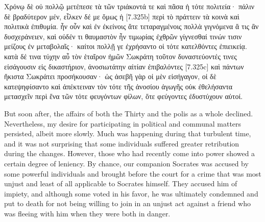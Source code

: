 \documentclass[12pt]{book}
\begin{document}
\begin{pairs}
\begin{Rightside}
\begin{Ancient Greek}
\beginnumbering
\pstart
Χρόνῳ δὲ οὐ πολλῷ μετέπεσε τὰ τῶν τριάκοντά τε καὶ πᾶσα ἡ τότε πολιτεία· πάλιν δὲ βραδύτερον μέν, εἷλκεν δέ με ὅμως ἡ [7.325b] περὶ τὸ πράττειν τὰ κοινὰ καὶ πολιτικὰ ἐπιθυμία. ἦν οὖν καὶ ἐν ἐκείνοις ἅτε τεταραγμένοις πολλὰ γιγνόμενα ἅ τις ἂν δυσχεράνειεν, καὶ οὐδέν τι θαυμαστὸν ἦν τιμωρίας ἐχθρῶν γίγνεσθαί τινών τισιν μείζους ἐν μεταβολαῖς· καίτοι πολλῇ γε ἐχρήσαντο οἱ τότε κατελθόντες ἐπιεικείᾳ. κατὰ δέ τινα τύχην αὖ τὸν ἑταῖρον ἡμῶν Σωκράτη τοῦτον δυναστεύοντές τινες εἰσάγουσιν εἰς δικαστήριον, ἀνοσιωτάτην αἰτίαν ἐπιβαλόντες [7.325c] καὶ πάντων ἥκιστα Σωκράτει προσήκουσαν· ὡς ἀσεβῆ γὰρ οἱ μὲν εἰσήγαγον, οἱ δὲ κατεψηφίσαντο καὶ ἀπέκτειναν τὸν τότε τῆς ἀνοσίου ἀγωγῆς οὐκ ἐθελήσαντα μετασχεῖν περὶ ἕνα τῶν τότε φευγόντων φίλων, ὅτε φεύγοντες ἐδυστύχουν αὐτοί. 	
\pend
\endnumbering
\end{Ancient Greek}
\end{Rightside}
\begin{Leftside}
\begin{English}
\beginnumbering
\pstart
But soon after, the affairs of both the Thirty and the polis as a whole declined. Nevertheless, my desire for participating in political and communal matters persisted, albeit more slowly. Much was happening during that turbulent time, and it was not surprising that some individuals suffered greater retribution during the changes. However, those who had recently come into power showed a certain degree of leniency. By chance, our companion Socrates was accused by some powerful individuals and brought before the court for a crime that was most unjust and least of all applicable to Socrates himself. They accused him of impiety, and although some voted in his favor, he was ultimately condemned and put to death for not being willing to join in an unjust act against a friend who was fleeing with him when they were both in danger.
\pend
\endnumbering
\end{English}
\end{Leftside}
\end{pairs}
\Columns
\end{document}
